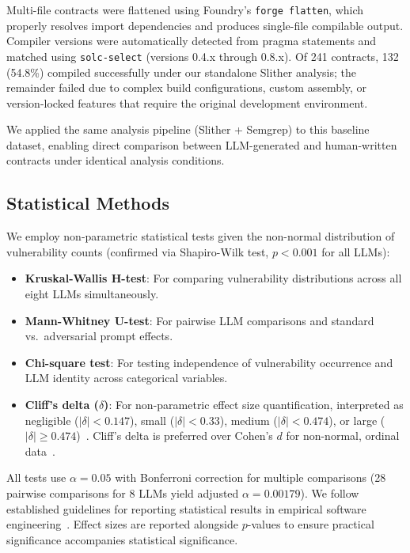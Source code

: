Multi-file contracts were flattened using Foundry's \texttt{forge flatten}, which properly resolves import dependencies and produces single-file compilable output. Compiler versions were automatically detected from pragma statements and matched using \texttt{solc-select} (versions 0.4.x through 0.8.x). Of 241 contracts, 132 (54.8\%) compiled successfully under our standalone Slither analysis; the remainder failed due to complex build configurations, custom assembly, or version-locked features that require the original development environment.

We applied the same analysis pipeline (Slither + Semgrep) to this baseline dataset, enabling direct comparison between LLM-generated and human-written contracts under identical analysis conditions.

\subsection{Statistical Methods}

We employ non-parametric statistical tests given the non-normal distribution of vulnerability counts (confirmed via Shapiro-Wilk test, $p < 0.001$ for all LLMs):

\begin{itemize}[leftmargin=*]
    \item \textbf{Kruskal-Wallis H-test}: For comparing vulnerability distributions across all eight LLMs simultaneously.
    \item \textbf{Mann-Whitney U-test}: For pairwise LLM comparisons and standard vs.\ adversarial prompt effects.
    \item \textbf{Chi-square test}: For testing independence of vulnerability occurrence and LLM identity across categorical variables.
    \item \textbf{Cliff's delta ($\delta$)}: For non-parametric effect size quantification, interpreted as negligible ($|\delta| < 0.147$), small ($|\delta| < 0.33$), medium ($|\delta| < 0.474$), or large ($|\delta| \geq 0.474$)~\cite{romano2006exploring}. Cliff's delta is preferred over Cohen's $d$ for non-normal, ordinal data~\cite{arcuri2011practical}.
\end{itemize}

All tests use $\alpha = 0.05$ with Bonferroni correction for multiple comparisons (28 pairwise comparisons for 8 LLMs yield adjusted $\alpha = 0.00179$). We follow established guidelines for reporting statistical results in empirical software engineering~\cite{arcuri2011practical}. Effect sizes are reported alongside $p$-values to ensure practical significance accompanies statistical significance.
